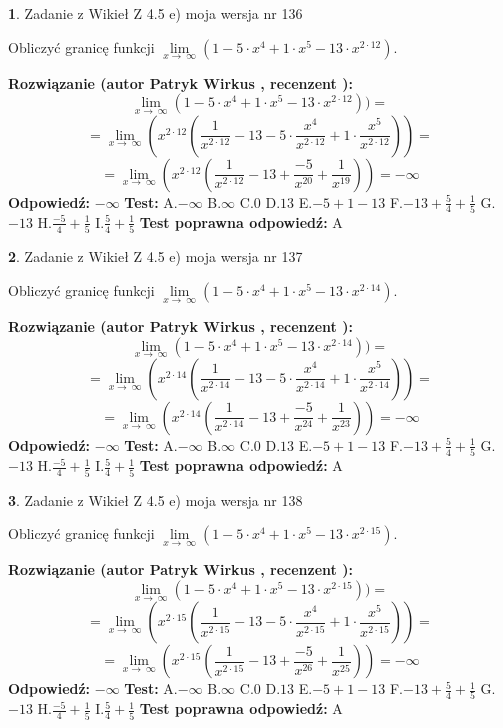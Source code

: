 \documentclass[12pt, a4paper]{article}
\theoremstyle{definition} %
\newtheorem{zad}{}
\newcommand{\zadStart}[1]{\begin{zad}#1\newline}
\newcommand{\zadStop}{\end{zad}}
\newcommand{\rozwStart}[2]{\noindent \textbf{Rozwiązanie (autor #1 , recenzent #2): }\newline}
\newcommand{\rozwStop}{\newline}
\newcommand{\odpStart}{\noindent \textbf{Odpowiedź:}\newline}
\newcommand{\odpStop}{\newline}
\newcommand{\testStart}{\noindent \textbf{Test:}\newline}
\newcommand{\testStop}{\newline}
\newcommand{\kluczStart}{\noindent \textbf{Test poprawna odpowiedź:}\newline}
\newcommand{\kluczStop}{\newline}
\begin{document}
\zadStart{Zadanie z Wikieł Z 4.5 e) moja wersja nr 136}



Obliczyć granicę funkcji  $\lim\limits_{x\to\ \infty}(1 - 5 \cdot x^{4}+1 \cdot x^{5}- 13 \cdot x^{2\cdot12})$.
\zadStop
\rozwStart{Patryk Wirkus}{}
$$\lim\limits_{x\to\ \infty}(1 - 5 \cdot x^{4}+1 \cdot x^{5}- 13 \cdot x^{2\cdot12}))=$$
$$=\lim\limits_{x\to\ \infty}(x^{2\cdot12}(\frac{1}{x^{2\cdot12}}-13 -5 \cdot \frac{x^{4}}{x^{2\cdot12}}+1 \cdot \frac{x^{5}}{x^{2\cdot12}}))=$$
$$=\lim\limits_{x\to\ \infty}(x^{2\cdot12}(\frac{1}{x^{2\cdot12}}-13 + \frac{-5}{x^{20}}+ \frac{1}{x^{19}}))=-\infty$$
\rozwStop
\odpStart
$-\infty$
\odpStop
\testStart
A.$-\infty$ B.$\infty$ C.$0$ D.$13$ E.$-5 + 1 - 13$
F.$-13+\frac{5}{4}+\frac{1}{5}$ G.$-13$
H.$\frac{-5}{4}+\frac{1}{5}$
I.$\frac{5}{4}+\frac{1}{5}$
\testStop
\kluczStart
A
\kluczStop



\zadStart{Zadanie z Wikieł Z 4.5 e) moja wersja nr 137}



Obliczyć granicę funkcji  $\lim\limits_{x\to\ \infty}(1 - 5 \cdot x^{4}+1 \cdot x^{5}- 13 \cdot x^{2\cdot14})$.
\zadStop
\rozwStart{Patryk Wirkus}{}
$$\lim\limits_{x\to\ \infty}(1 - 5 \cdot x^{4}+1 \cdot x^{5}- 13 \cdot x^{2\cdot14}))=$$
$$=\lim\limits_{x\to\ \infty}(x^{2\cdot14}(\frac{1}{x^{2\cdot14}}-13 -5 \cdot \frac{x^{4}}{x^{2\cdot14}}+1 \cdot \frac{x^{5}}{x^{2\cdot14}}))=$$
$$=\lim\limits_{x\to\ \infty}(x^{2\cdot14}(\frac{1}{x^{2\cdot14}}-13 + \frac{-5}{x^{24}}+ \frac{1}{x^{23}}))=-\infty$$
\rozwStop
\odpStart
$-\infty$
\odpStop
\testStart
A.$-\infty$ B.$\infty$ C.$0$ D.$13$ E.$-5 + 1 - 13$
F.$-13+\frac{5}{4}+\frac{1}{5}$ G.$-13$
H.$\frac{-5}{4}+\frac{1}{5}$
I.$\frac{5}{4}+\frac{1}{5}$
\testStop
\kluczStart
A
\kluczStop



\zadStart{Zadanie z Wikieł Z 4.5 e) moja wersja nr 138}



Obliczyć granicę funkcji  $\lim\limits_{x\to\ \infty}(1 - 5 \cdot x^{4}+1 \cdot x^{5}- 13 \cdot x^{2\cdot15})$.
\zadStop
\rozwStart{Patryk Wirkus}{}
$$\lim\limits_{x\to\ \infty}(1 - 5 \cdot x^{4}+1 \cdot x^{5}- 13 \cdot x^{2\cdot15}))=$$
$$=\lim\limits_{x\to\ \infty}(x^{2\cdot15}(\frac{1}{x^{2\cdot15}}-13 -5 \cdot \frac{x^{4}}{x^{2\cdot15}}+1 \cdot \frac{x^{5}}{x^{2\cdot15}}))=$$
$$=\lim\limits_{x\to\ \infty}(x^{2\cdot15}(\frac{1}{x^{2\cdot15}}-13 + \frac{-5}{x^{26}}+ \frac{1}{x^{25}}))=-\infty$$
\rozwStop
\odpStart
$-\infty$
\odpStop
\testStart
A.$-\infty$ B.$\infty$ C.$0$ D.$13$ E.$-5 + 1 - 13$
F.$-13+\frac{5}{4}+\frac{1}{5}$ G.$-13$
H.$\frac{-5}{4}+\frac{1}{5}$
I.$\frac{5}{4}+\frac{1}{5}$
\testStop
\kluczStart
A
\kluczStop
\end{document}
